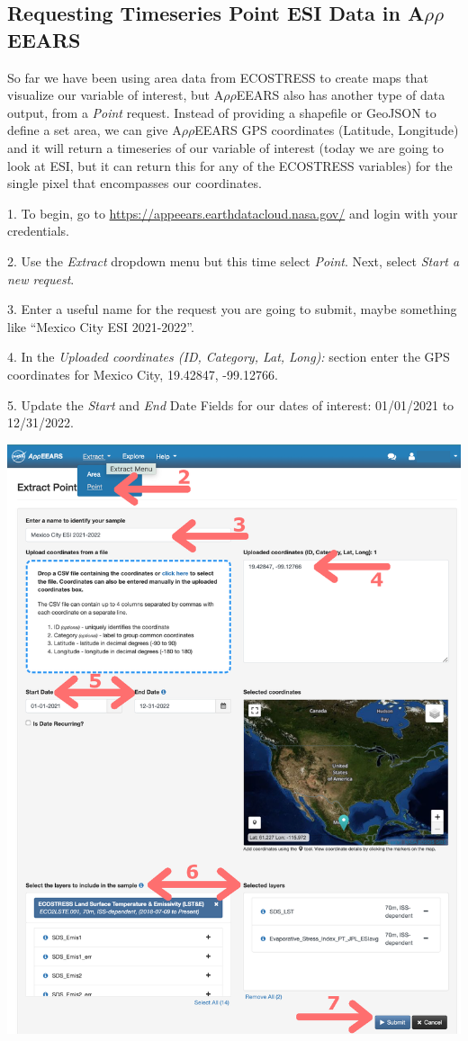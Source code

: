 \documentclass[oneside,a4paper,11pt,explicit]{book}
\begin{document}
\subsection{Requesting Timeseries Point ESI Data in A$\rho\rho$EEARS}

So far we have been using area data from ECOSTRESS to create maps that visualize our variable of interest, but A$\rho\rho$EEARS also has another type of data output, from a \textit{Point} request. Instead of providing a shapefile or GeoJSON to define a set area, we can give A$\rho\rho$EEARS GPS coordinates (Latitude, Longitude) and it will return a timeseries of our variable of interest (today we are going to look at ESI, but it can return this for any of the ECOSTRESS variables) for the single pixel that encompasses our coordinates.

1. To begin, go to \href{https://appeears.earthdatacloud.nasa.gov/}{https://appeears.earthdatacloud.nasa.gov/} and login with your credentials. 

2. Use the \textit{Extract} dropdown menu but this time select \textit{Point}. Next, select \textit{ Start a new request}. 

3. Enter a useful name for the request you are going to submit, maybe something like ``Mexico City ESI 2021-2022''. 

4. In the \textit{Uploaded coordinates (ID, Category, Lat, Long):} section enter the GPS coordinates for Mexico City, 19.42847, -99.12766.

5. Update the \textit{Start} and \textit{End} Date Fields for our dates of interest: 01/01/2021 to 12/31/2022.

\centerline{\includegraphics[width=.6\textwidth]{ESIpointRequest.png}}
\end{document}
